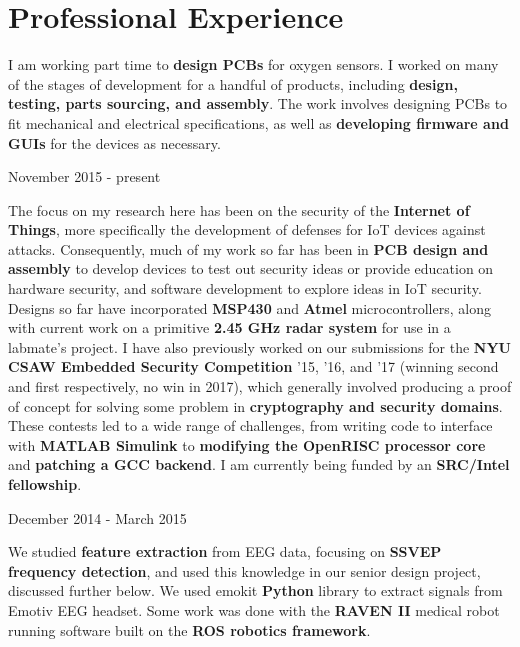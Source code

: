 \documentclass{my_resume}
\begin{document}
\section{Professional Experience}
\begin{flushleft}
I am working part time to \textbf{design PCBs} for oxygen sensors.
I worked on many of the stages of development for a handful of products, including \textbf{design, testing, parts sourcing, and assembly}.
The work involves designing PCBs to fit mechanical and electrical specifications, as well as \textbf{developing firmware and GUIs} for the devices as necessary.
\end{flushleft}
    {November 2015 - present}
\begin{flushleft}
The focus on my research here has been on the security of the \textbf{Internet of Things}, more specifically the development of defenses for IoT devices against attacks.
Consequently, much of my work so far has been in \textbf{PCB design and assembly} to develop devices to test out security ideas or provide education on hardware security, and software development to explore ideas in IoT security.
Designs so far have incorporated \textbf{MSP430} and \textbf{Atmel} microcontrollers, along with current work on a primitive \textbf{2.45 GHz radar system} for use in a labmate's project.
I have also previously worked on our submissions for the \textbf{NYU CSAW Embedded Security Competition} '15, '16, and '17 (winning second and first respectively, no win in 2017), which generally involved producing a proof of concept for solving some problem in \textbf{cryptography and security domains}.
These contests led to a wide range of challenges, from writing code to interface with \textbf{MATLAB Simulink} to \textbf{modifying the OpenRISC processor core} and \textbf{patching a GCC backend}.
I am currently being funded by an \textbf{SRC/Intel fellowship}.
\end{flushleft}
	{December 2014 - March 2015}
\begin{flushleft}
We studied \textbf{feature extraction} from EEG data, focusing on \textbf{SSVEP frequency detection}, and used this knowledge in our senior design project, discussed further below.
We used emokit \textbf{Python} library to extract signals from Emotiv EEG headset.
Some work was done with the \textbf{RAVEN II} medical robot running software built on the \textbf{ROS robotics framework}.
\end{flushleft}
\end{document}
